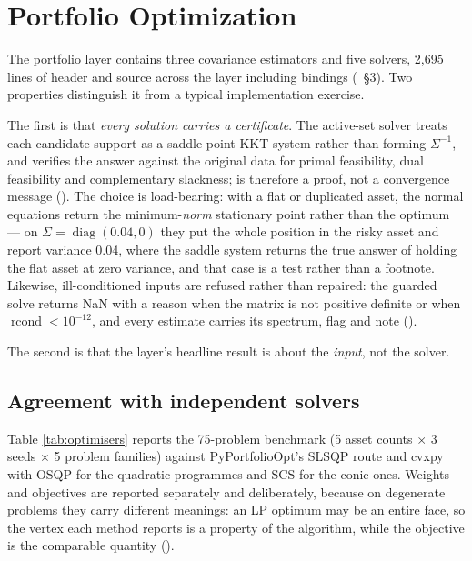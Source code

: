 \documentclass[11pt,a4paper]{article}
\begin{document}
\section{Portfolio Optimization}
\label{sec:portfolio}

The portfolio layer contains three covariance estimators and five solvers, 2{,}695 lines
of header and source across the layer including bindings
(~\S3). Two properties distinguish
it from a typical implementation exercise.

The first is that \emph{every solution carries a certificate}. The active-set solver treats
each candidate support as a saddle-point KKT system rather than forming $\Sigma^{-1}$, and
verifies the answer against the original data for primal feasibility, dual feasibility and
complementary slackness;  is therefore a proof, not a convergence
message (). The choice is
load-bearing: with a flat or duplicated asset, the normal equations return the
minimum-\emph{norm} stationary point rather than the optimum --- on $\Sigma =
\operatorname{diag}(0.04, 0)$ they put the whole position in the risky asset and report
variance 0.04, where the saddle system returns the true answer of holding the flat asset at
zero variance, and that case is a test rather than a footnote. Likewise, ill-conditioned
inputs are refused rather than repaired: the guarded  solve returns NaN with a
reason when the matrix is not positive definite or when $\operatorname{rcond} < 10^{-12}$,
and every estimate carries its spectrum,  flag and note
().

The second is that the layer's headline result is about the \emph{input}, not the solver.

\subsection{Agreement with independent solvers}
Table \ref{tab:optimisers} reports the 75-problem benchmark (5 asset counts $\times$ 3 seeds
$\times$ 5 problem families) against PyPortfolioOpt's SLSQP route and cvxpy with OSQP for the
quadratic programmes and SCS for the conic ones. Weights and objectives are reported
separately and deliberately, because on degenerate problems they carry different meanings: an
LP optimum may be an entire face, so the vertex each method reports is a property of the
algorithm, while the objective is the comparable quantity
().
\end{document}
